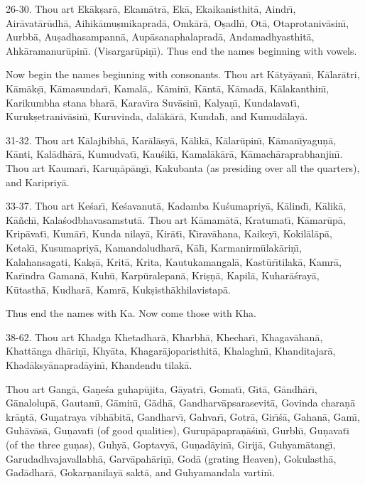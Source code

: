26-30. Thou art Ek\=ak\d{s}ar\=a, Ekam\=atr\=a, Ek\=a, Ekaikanisthit\=a, Aindr\={\i}, Air\=avat\=ar\=udh\=a, Aihik\=amu\d{s}mikaprad\=a, Omk\=ar\=a, O\d{s}adh\={\i}, Ot\=a, Otaprotaniv\=asin\={\i}, Aurbb\=a, Au\d{s}adhasampann\=a, Aup\=asanaphalaprad\=a, Andamadhyasthit\=a, Ahk\=aramanur\=upin\={\i}. (Visargar\=upi\d{n}\={\i}). Thus end the names beginning with vowels.

Now begin the names beginning with consonants. Thou art K\=aty\=ayan\={\i}, K\=alar\=atri, K\=am\=ak\d{s}\={\i}, K\=amasundar\={\i}, Kamal\=a,. K\=amin\={\i}, K\=ant\=a, K\=amad\=a, K\=alakanthin\={\i}, Karikumbha stana bhar\=a, Karav\={\i}ra Suv\=asin\={\i}, Kalya\d{n}\={\i}, Kundalavat\={\i}, Kuruk\d{s}etraniv\=asin\={\i}, Kuruvinda, dal\=ak\=ar\=a, Kundal\={\i}, and Kumud\=alay\=a.

31-32. Thou art K\=alajhibh\=a, Kar\=al\=asy\=a, K\=alik\=a, K\=alar\=upin\={\i}, K\=aman\={\i}yagu\d{n}\=a, K\=anti, Kal\=adh\=ar\=a, Kumudvat\={\i}, Kau\'sik\={\i}, Kamal\=ak\=ar\=a, K\=amach\=araprabhanjin\={\i}. Thou art Kaumar\={\i}, Karu\d{n}\=ap\=ang\={\i}, Kakubanta (as presiding over all the quarters), and Karipriy\=a.

33-37. Thou art Ke\'sar\={\i}, Ke\'savanut\=a, Kadamba Ku\'sumapriy\=a, K\=alind\={\i}, K\=alik\=a, K\=a\~nch\={\i}, Kala\'sodbhavasamstut\=a. Thou art K\=amam\=at\=a, Kratumat\={\i}, K\=amar\=up\=a, Krip\=avat\={\i}, Kum\=ar\={\i}, Kunda nilay\=a, Kir\=at\={\i}, K\={\i}rav\=ahana, Kaikey\={\i}, Kokil\=al\=ap\=a, Ketak\={\i}, Kusumapriy\=a, Kamandaludhar\=a, K\=al\={\i}, Karmanirm\=ulak\=ari\d{n}\={\i}, Kalahansagati, Kak\d{s}\=a, Krit\=a, Krita, Kautukamangal\=a, Kast\=ur\={\i}tilak\=a, Kamr\=a, Kar\={\i}ndra Gaman\=a, Kuh\=u, Karp\=uralepan\=a, Kri\d{s}\d{n}\=a, Kapil\=a, Kuhar\=a\'sray\=a, K\=utasth\=a, Kudhar\=a, Kamr\=a, Kuk\d{s}isth\=akhilavistap\=a.

Thus end the names with Ka. Now come those with Kha.

38-62. Thou art Khadga Khetadhar\=a, Kharbh\=a, Khechar\={\i}, Khagav\=ahan\=a, Khatt\=anga dh\=ari\d{n}\={\i}, Khy\=ata, Khagar\=ajoparisthit\=a, Khalaghn\={\i}, Khanditajar\=a, Khad\=aksy\=anaprad\=ayin\={\i}, Khandendu tilak\=a.

Thou art Gang\=a, Ga\d{n}e\'sa guhap\=ujita, G\=ayatr\={\i}, Gomat\={\i}, G\={\i}t\=a, G\=andh\=ar\={\i}, G\=analolup\=a, Gautam\={\i}, G\=amin\={\i}, G\=adh\=a, Gandharv\=apsarasevit\=a, Govinda chara\d{n}\=a kr\=a\d{n}t\=a, Gu\d{n}atraya vibh\=abit\=a, Gandharv\={\i}, Gahvar\={\i}, Gotr\=a, Gir\={\i}\'s\=a, Gahan\=a, Gam\={\i}, Guh\=av\=as\=a, Gu\d{n}avat\={\i} (of good qualities), Gurup\=apapra\d{n}\=a\'sin\={\i}, Gurbh\={\i}, Gu\d{n}avat\={\i} (of the three gu\d{n}as), Guhy\=a, Goptavy\=a, Gu\d{n}ad\=ayin\={\i}, Girij\=a, Guhyam\=atang\={\i}, Garudadhvajavallabh\=a, Garv\=apah\=ari\d{n}\={\i}, God\=a (grating Heaven), Gokulasth\=a, Gad\=adhar\=a, Gokar\d{n}anilay\=a sakt\=a, and Guhyamandala vartin\={\i}.

